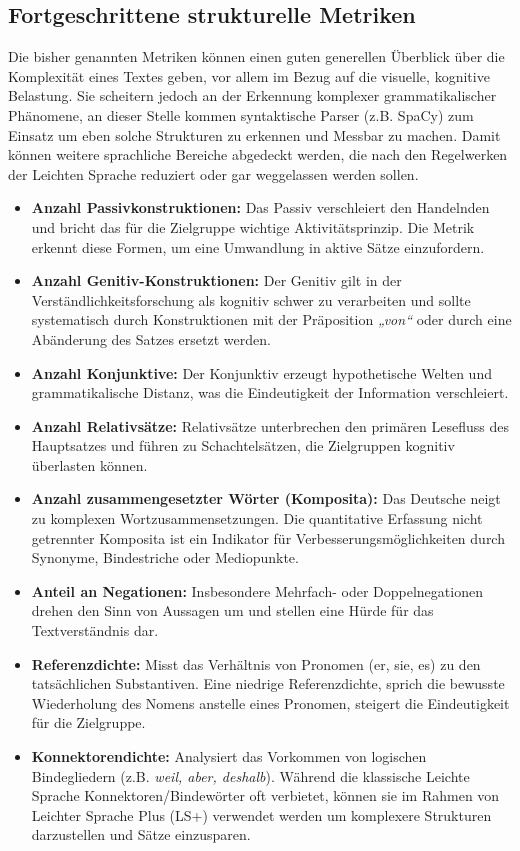\subsection{Fortgeschrittene strukturelle Metriken}
Die bisher genannten Metriken können einen guten generellen Überblick über die Komplexität eines Textes geben, vor allem im Bezug auf die visuelle, kognitive Belastung. Sie scheitern jedoch an der Erkennung komplexer grammatikalischer Phänomene, an dieser Stelle kommen syntaktische Parser (z.B. SpaCy) zum Einsatz um eben solche Strukturen zu erkennen und Messbar zu machen. Damit können weitere sprachliche Bereiche abgedeckt werden, die nach den Regelwerken der Leichten Sprache reduziert oder gar weggelassen werden sollen.

\begin{itemize}
	\item \textbf{Anzahl Passivkonstruktionen:} Das Passiv verschleiert den Handelnden und bricht das für die Zielgruppe wichtige Aktivitätsprinzip. Die Metrik erkennt diese Formen, um eine Umwandlung in aktive Sätze einzufordern.
	\item \textbf{Anzahl Genitiv-Konstruktionen:} Der Genitiv gilt in der Verständlichkeitsforschung als kognitiv schwer zu verarbeiten und sollte systematisch durch Konstruktionen mit der Präposition \textit{„von“} oder durch eine Abänderung des Satzes ersetzt werden.
	\item \textbf{Anzahl Konjunktive:} Der Konjunktiv erzeugt hypothetische Welten und grammatikalische Distanz, was die Eindeutigkeit der Information verschleiert.
	\item \textbf{Anzahl Relativsätze:} Relativsätze unterbrechen den primären Lesefluss des Hauptsatzes und führen zu Schachtelsätzen, die Zielgruppen kognitiv überlasten können.
	\item \textbf{Anzahl zusammengesetzter Wörter (Komposita):} Das Deutsche neigt zu komplexen Wortzusammensetzungen. Die quantitative Erfassung nicht getrennter Komposita ist ein Indikator für Verbesserungsmöglichkeiten durch Synonyme, Bindestriche oder Mediopunkte.
	\item \textbf{Anteil an Negationen:} Insbesondere Mehrfach- oder Doppelnegationen drehen den Sinn von Aussagen um und stellen eine Hürde für das Textverständnis dar.
	\item \textbf{Referenzdichte:} Misst das Verhältnis von Pronomen (er, sie, es) zu den tatsächlichen Substantiven. Eine niedrige Referenzdichte, sprich die bewusste Wiederholung des Nomens anstelle eines Pronomen, steigert die Eindeutigkeit für die Zielgruppe.
	\item \textbf{Konnektorendichte:} Analysiert das Vorkommen von logischen Bindegliedern (z.B. \textit{weil, aber, deshalb}). Während die klassische Leichte Sprache Konnektoren/Bindewörter oft verbietet, können sie im Rahmen von Leichter Sprache Plus (LS+) verwendet werden um komplexere Strukturen darzustellen und Sätze einzusparen.
\end{itemize}

